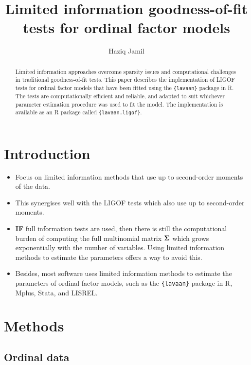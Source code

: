\documentclass[
  letterpaper,
  DIV=11,
  numbers=noendperiod]{scrartcl}
\title{Limited information goodness-of-fit tests for ordinal factor
models}
\author{Haziq Jamil}
\date{}
\providecommand{\tightlist}{%
  \setlength{\itemsep}{0pt}\setlength{\parskip}{0pt}}
\begin{document}
\maketitle
\begin{abstract}
Limited information approaches overcome sparsity issues and
computational challenges in traditional goodness-of-fit tests. This
paper describes the implementation of LIGOF tests for ordinal factor
models that have been fitted using the \texttt{\{lavaan\}} package in R.
The tests are computationally efficient and reliable, and adapted to
suit whichever parameter estimation procedure was used to fit the model.
The implementation is available as an R package called
\texttt{\{lavaan.ligof\}}.
\end{abstract}


\section{Introduction}\label{introduction}

\begin{itemize}
\tightlist
\item
  Focus on limited information methods that use up to second-order
  moments of the data.
\item
  This synergises well with the LIGOF tests which also use up to
  second-order moments.
\item
  \textbf{IF} full information tests are used, then there is still the
  computational burden of computing the full multinomial matrix
  \({\boldsymbol\Sigma}\) which grows exponentially with the number of variables.
  Using limited information methods to estimate the parameters offers a
  way to avoid this.
\item
  Besides, most software uses limited information methods to estimate
  the parameters of ordinal factor models, such as the
  \texttt{\{lavaan\}} package in R, Mplus, Stata, and LISREL.
\end{itemize}

\section{Methods}\label{methods}

\subsection{Ordinal data}\label{ordinal-data}
\end{document}
